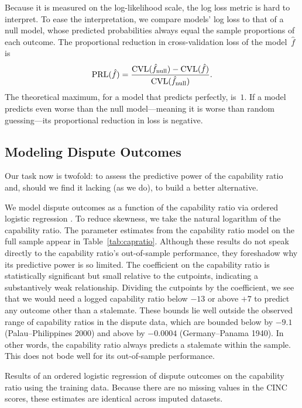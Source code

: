 Because it is measured on the log-likelihood scale, the log loss metric is hard to interpret.
To ease the interpretation, we compare models' log loss to that of a null model, whose predicted probabilities always equal the sample proportions of each outcome.
The proportional reduction in cross-validation loss of the model~$\hat{f}$ is
\begin{equation}
  \label{eq:prl}
  \operatorname{PRL}(\hat{f})
  =
  \frac{
    \operatorname{CVL}(\hat{f}_{\text{null}}) - \operatorname{CVL}(\hat{f})
  }{
    \operatorname{CVL}(\hat{f}_{\text{null}})
  }.
\end{equation}
The theoretical maximum, for a model that predicts perfectly, is~$1$.
If a model predicts even worse than the null model---meaning it is worse than random guessing---its proportional reduction in loss is negative.

\subsection{Modeling Dispute Outcomes}

Our task now is twofold: to assess the predictive power of the capability ratio and, should we find it lacking (as we do), to build a better alternative.

We model dispute outcomes as a function of the capability ratio via ordered logistic regression \citep{McKelvey:2010gv}.
To reduce skewness, we take the natural logarithm of the capability ratio.
The parameter estimates from the capability ratio model on the full sample appear in Table~\ref{tab:capratio}.
Although these results do not speak directly to the capability ratio's out-of-sample performance, they foreshadow why its predictive power is so limited.
The coefficient on the capability ratio is statistically significant but small relative to the cutpoints, indicating a substantively weak relationship.
Dividing the cutpoints by the coefficient, we see that we would need a logged capability ratio below $-13$ or above $+7$ to predict any outcome other than a stalemate.
These bounds lie well outside the observed range of capability ratios in the dispute data, which are bounded below by $-9.1$ (Palau--Philippines 2000) and above by $-0.0004$ (Germany--Panama 1940).
In other words, the capability ratio always predicts a stalemate within the sample.
This does not bode well for its out-of-sample performance.

\begin{table}[tp]
  \centering
  
  \caption{
    Results of an ordered logistic regression of dispute outcomes on the capability ratio using the training data.
    Because there are no missing values in the CINC scores, these estimates are identical across imputed datasets.
  }
  \label{tab:capratio}
\end{table}

